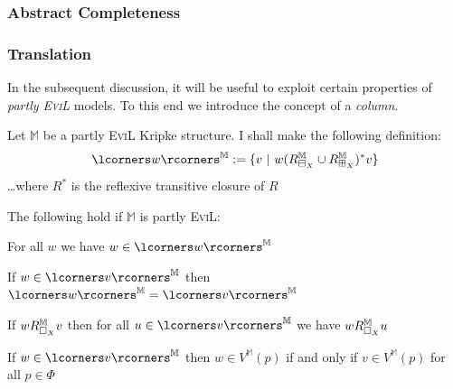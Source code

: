 \subsubsection{Abstract Completeness}
\label{Abstract-Completeness}

%
\subsubsection{Translation}\label{translation}

In the subsequent discussion, it will be useful to exploit certain properties of \emph{partly \textsc{EviL}} models.  To this end we introduce the concept of a \emph{column}.

\begin{mydef}Let $\mathbb{M}$ be a partly \textsc{EviL} Kripke structure.  I shall make the following definition:
\[ \lcorners w\rcorners^\mathbb{M} := \{ v\ |\ w (R^{\mathbb{M}}_{\BB_X}\cup R^{\mathbb{M}}_{\BBI_X})^\ast v \}\]
\ldots where $R^\ast$ is the reflexive transitive closure of $R$
\end{mydef}

\begin{lemma}\label{column}
The following hold if $\mathbb{M}$ is partly \textsc{EviL}:
\begin{mynum}
	\item For all $w$ we have $w \in \lcorners w\rcorners^\mathbb{M}$
	\item If $w \in \lcorners v\rcorners^\mathbb{M}$ then $\lcorners w\rcorners^\mathbb{M} = \lcorners v\rcorners^\mathbb{M}$
	\item If $w R^\mathbb{M}_{\Box_X} v$ then for all $u \in \lcorners v\rcorners^\mathbb{M}$ we have $w R^\mathbb{M}_{\Box_X} u$
	\item If $w \in \lcorners v\rcorners^\mathbb{M}$ then $w\in V^\mathbb{M}(p)$ if and only if $v \in V^\mathbb{M}(p)$ for all $p \in \Phi$
\end{mynum}

\end{lemma}

